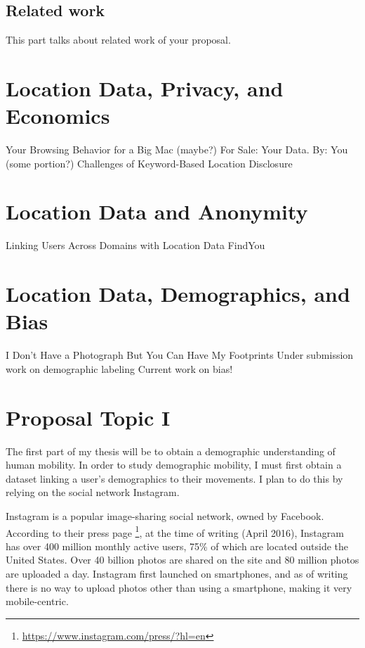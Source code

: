 \documentclass[12pt]{article}
\begin{document}
\subsection{Related work}
\label{ch:related}

This part talks about related work of your proposal.

\section{Location Data, Privacy, and Economics}
\label{sec:econ}

Your Browsing Behavior for a Big Mac (maybe?)
For Sale: Your Data. By: You (some portion?)
Challenges of Keyword-Based Location Disclosure



\section{Location Data and Anonymity}
\label{sec:anon}
Linking Users Across Domains with Location Data
FindYou



\section{Location Data, Demographics, and Bias}
\label{sec:bias}

I Don’t Have a Photograph But You Can Have My Footprints
Under submission work on demographic labeling
Current work on bias!



\section{Proposal Topic I}
\label{ch:proposal}
The first part of my thesis will be to obtain a demographic understanding of human mobility.
In order to study demographic mobility, I must first obtain a dataset linking a user's demographics to their movements.
I plan to do this by relying on the social network Instagram.

Instagram is a popular image-sharing social network, owned by Facebook.
According to their press page \footnote{\url{https://www.instagram.com/press/?hl=en}}, at the time of writing (April 2016), Instagram has over 400 million monthly active users, 75\% of which are located outside the United States.
Over 40 billion photos are shared on the site and 80 million photos are uploaded a day.
Instagram first launched on smartphones, and as of writing there is no way to upload photos other than using a smartphone, making it very mobile-centric.
\end{document}
